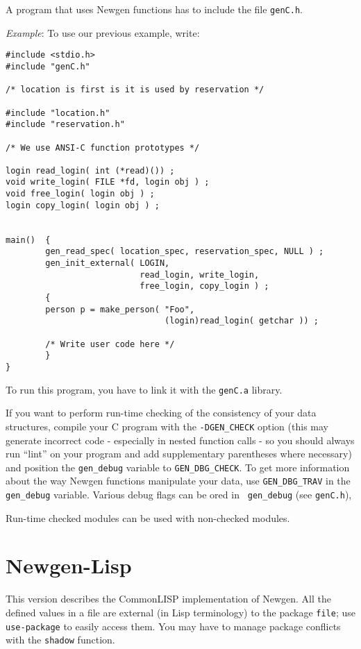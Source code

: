 A program that uses Newgen functions has to include the file {\tt genC.h}.

{\em Example}: To use our previous example, write:
\begin{verbatim}
#include <stdio.h>
#include "genC.h"

/* location is first is it is used by reservation */

#include "location.h"
#include "reservation.h"

/* We use ANSI-C function prototypes */

login read_login( int (*read)()) ;
void write_login( FILE *fd, login obj ) ;
void free_login( login obj ) ;
login copy_login( login obj ) ;


main()  {
        gen_read_spec( location_spec, reservation_spec, NULL ) ;
        gen_init_external( LOGIN, 
                           read_login, write_login, 
                           free_login, copy_login ) ;
        {
        person p = make_person( "Foo", 
                                (login)read_login( getchar )) ;

        /* Write user code here */
        }
}       
\end{verbatim}

To run this program, you have to link it with the {\tt genC.a} library.

If you want to perform run-time checking of the consistency of your data
structures, compile your C program with the {\tt -DGEN\_CHECK} option
(this may generate incorrect code - especially in nested function calls -
so you should always run ``lint'' on your program and add supplementary
parentheses where necessary) and position the {\tt gen\_debug} variable
to {\tt GEN\_DBG\_CHECK}. To get more information about the way Newgen
functions manipulate your data, use {\tt GEN\_DBG\_TRAV} in the {\tt
gen\_debug} variable. Various debug flags can be ored in {\tt
gen\_debug} (see {\tt genC.h}),

Run-time checked modules can be used with non-checked modules.

\section{Newgen-Lisp}

This version describes the CommonLISP implementation of Newgen. All the
defined values in a file are external (in Lisp terminology) to the
package {\tt file}; use {\tt use-package} to easily access them. You may
have to manage package conflicts with the {\tt shadow} function.

